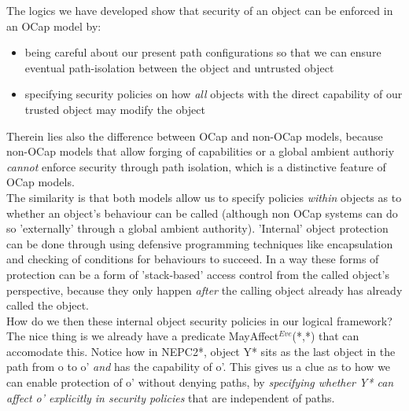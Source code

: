\documentclass[a4paper,11pt, twoside,twocolumn]{article}
\begin{document}
The logics we have developed show that security of an object can be enforced in an OCap model by:
\begin{itemize}
\item being careful about our present path configurations so that we can ensure eventual path-isolation between the object and untrusted object
\item specifying security policies on how \textit{all} objects with the direct capability of our trusted object may modify the object
\end{itemize}
Therein lies also the difference between OCap and non-OCap models, because non-OCap models that allow forging of capabilities or a global ambient authoriy \textit{cannot} enforce security through path isolation, which is a distinctive feature of OCap models.\\

The similarity is that both models allow us to specify policies \textit{within} objects as to whether an object's behaviour can be called (although non OCap systems can do so 'externally' through a global ambient authority). 'Internal' object protection can be done through using defensive programming techniques like encapsulation and checking of conditions for behaviours to succeed. In a way these forms of protection can be a form of 'stack-based' access control from the called object's perspective, because they only happen \textit{after} the calling object already has already called the object.\\

How do we then these internal object security policies in our logical framework? The nice thing is we already have a predicate MayAffect$^{Eve}$(*,*) that can accomodate this. Notice how in \textsc{NEPC2*}, object Y* sits as the last object in the path from o to o' \textit{and} has the capability of o'. This gives us a clue as to how we can enable protection of o' without denying paths, by \textit{specifying whether Y* can affect o' explicitly in security policies} that are independent of paths.
\end{document}

